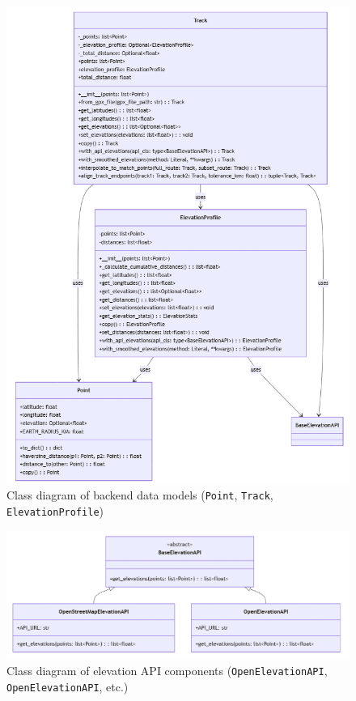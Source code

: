 \documentclass[12pt]{article}
\begin{document}
\begin{figure}[h!]
    \centering
    \includegraphics[height=0.8\textheight]{Project_Screenshots/class_diagram_models.png}
    \caption{Class diagram of backend data models (\texttt{Point}, \texttt{Track}, \texttt{ElevationProfile})}
\end{figure}

\begin{figure}[h!]
    \centering
    \includegraphics[width=\textwidth]{Project_Screenshots/class_diagram_elevation_apis.png}
    \caption{Class diagram of elevation API components (\texttt{OpenElevationAPI}, \texttt{OpenElevationAPI}, etc.)}
\end{figure}
\end{document}
